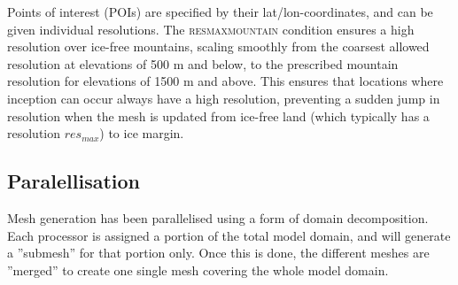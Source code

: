 \documentclass{article}
\begin{document}
Points of interest (POIs) are specified by their lat/lon-coordinates, and can be given individual resolutions. The \textsc{res\textunderscore max\textunderscore mountain} condition ensures a high resolution over ice-free mountains, scaling smoothly from the coarsest allowed resolution at elevations of 500 m and below, to the prescribed mountain resolution for elevations of 1500 m and above. This ensures that locations where inception can occur always have a high resolution, preventing a sudden jump in resolution when the mesh is updated from ice-free land (which typically has a resolution $res_{max}$) to ice margin.

\subsection{Paralellisation}

Mesh generation has been parallelised using a form of domain decomposition. Each processor is assigned a portion of the total model domain, and will generate a ''submesh'' for that portion only. Once this is done, the different meshes are ''merged'' to create one single mesh covering the whole model domain.
\end{document}
